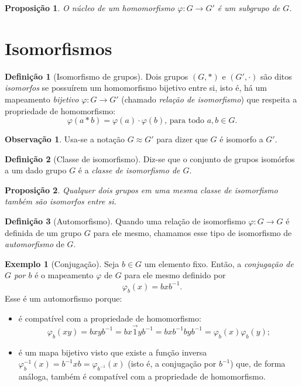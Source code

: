 \documentclass[a4paper,12pt]{report}
\theoremstyle{plain}
\newtheorem{proposicao}{Proposição}[section]
\theoremstyle{definition}
\newtheorem{definicao}{Definição}[section]
\newtheorem{observacao}{Observação}[section]
\newtheorem{exemplo}{Exemplo}[section]
\begin{document}
\begin{proposicao}
	O núcleo de um homomorfismo $\varphi: G \longrightarrow G'$ é um subgrupo de $G$.
\end{proposicao}

\section{Isomorfismos}

\begin{definicao}[Isomorfismo de grupos]
	Dois grupos \((G,*)\) e \((G',\cdot)\) são ditos \emph{isomorfos} se possuírem um homomorfismo bijetivo entre si, isto é, há um mapeamento \emph{bijetivo} $\varphi: G \longrightarrow G'$ (chamado \emph{relação de isomorfismo}) que respeita a propriedade de homomorfismo:
	\[\varphi(a*b) = \varphi(a)\cdot\varphi(b) \text{, para todo } a,b \in G.\] 
\end{definicao}

\begin{observacao}
	Usa-se a notação $G \approx G'$ para dizer que $G$ é isomorfo a $G'$.  
\end{observacao}

\begin{definicao}[Classe de isomorfismo]
	Diz-se que o conjunto de grupos isomórfos a um dado grupo \(G\) é a \emph{classe de isomorfismo de \(G\)}.	
\end{definicao}

\begin{proposicao}
	Qualquer dois grupos em uma mesma classe de isomorfismo também são isomorfos entre si.
\end{proposicao}

\begin{definicao}[Automorfismo]
	Quando uma relação de isomorfismo \(\varphi: G\longrightarrow G\) é definida de um grupo \(G\) para ele mesmo,	chamamos esse tipo de isomorfismo de \emph{automorfismo} de \(G\).
\end{definicao}

\begin{exemplo}[Conjugação]
	 Seja \(b\in G\) um elemento fixo. Então, a
	\emph{conjugação de \(G\) por \(b\)} é o mapeamento \(\varphi\) de \(G\)
	para ele mesmo definido por
	\[\varphi_b(x) = bxb^{-1}.\]
	Esse é um automorfismo porque:
	\begin{itemize}
		\item é compatível com a propriedade de homomorfismo: \[\varphi_b(xy) = bxyb^{-1} = bx\vec{1}yb^{-1} = bxb^{-1}byb^{-1} = \varphi_b(x)\varphi_b(y);\]
		\item é um mapa bijetivo visto que existe a função inversa $\varphi_b^{-1}(x) = b^{-1}xb = \varphi_{b^{-1}}(x)$ (isto é, a conjugação por \(b^{-1}\)) que, de forma análoga, também é compatível com a propriedade de homomorfismo.
	\end{itemize}
\end{exemplo}
\end{document}
